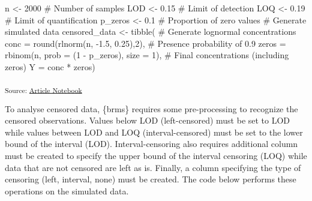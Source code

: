 \documentclass[
]{article}
\newenvironment{Shaded}{\begin{snugshade}}{\end{snugshade}}
\newcommand{\AttributeTok}[1]{\textcolor[rgb]{0.40,0.45,0.13}{#1}}
\newcommand{\CommentTok}[1]{\textcolor[rgb]{0.37,0.37,0.37}{#1}}
\newcommand{\DecValTok}[1]{\textcolor[rgb]{0.68,0.00,0.00}{#1}}
\newcommand{\FloatTok}[1]{\textcolor[rgb]{0.68,0.00,0.00}{#1}}
\newcommand{\FunctionTok}[1]{\textcolor[rgb]{0.28,0.35,0.67}{#1}}
\newcommand{\NormalTok}[1]{\textcolor[rgb]{0.00,0.23,0.31}{#1}}
\newcommand{\OtherTok}[1]{\textcolor[rgb]{0.00,0.23,0.31}{#1}}
\newcommand{\SpecialCharTok}[1]{\textcolor[rgb]{0.37,0.37,0.37}{#1}}
\begin{document}
\begin{Shaded}
\begin{Highlighting}[]
\NormalTok{n }\OtherTok{\textless{}{-}} \DecValTok{2000}       \CommentTok{\# Number of samples}
\NormalTok{LOD }\OtherTok{\textless{}{-}} \FloatTok{0.15}     \CommentTok{\# Limit of detection}
\NormalTok{LOQ }\OtherTok{\textless{}{-}} \FloatTok{0.19}     \CommentTok{\# Limit of quantification}
\NormalTok{p\_zeros }\OtherTok{\textless{}{-}} \FloatTok{0.1}  \CommentTok{\# Proportion of zero values}
\CommentTok{\# Generate simulated data}
\NormalTok{censored\_data }\OtherTok{\textless{}{-}} \FunctionTok{tibble}\NormalTok{(}
  \CommentTok{\# Generate lognormal concentrations}
  \AttributeTok{conc =} \FunctionTok{round}\NormalTok{(}\FunctionTok{rlnorm}\NormalTok{(n, }\SpecialCharTok{{-}}\FloatTok{1.5}\NormalTok{, }\FloatTok{0.25}\NormalTok{),}\DecValTok{2}\NormalTok{),  }
  \CommentTok{\# Presence probability of 0.9}
  \AttributeTok{zeros =} \FunctionTok{rbinom}\NormalTok{(n, }\AttributeTok{prob =}\NormalTok{ (}\DecValTok{1} \SpecialCharTok{{-}}\NormalTok{ p\_zeros), }\AttributeTok{size =} \DecValTok{1}\NormalTok{),  }
  \CommentTok{\# Final concentrations (including zeros)}
  \AttributeTok{Y =}\NormalTok{ conc }\SpecialCharTok{*}\NormalTok{ zeros)                        }
\end{Highlighting}
\end{Shaded}

\textsubscript{Source:
\href{https://abushbeaupre.github.io/quantifying_pesticides/index.qmd.html}{Article
Notebook}}

To analyse censored data, \{brms\} requires some pre-processing to
recognize the censored observations. Values below LOD (left-censored)
must be set to LOD while values between LOD and LOQ (interval-censored)
must be set to the lower bound of the interval (LOD). Interval-censoring
also requires additional column must be created to specify the upper
bound of the interval censoring (LOQ) while data that are not censored
are left as is. Finally, a column specifying the type of censoring
(left, interval, none) must be created. The code below performs these
operations on the simulated data.
\end{document}
